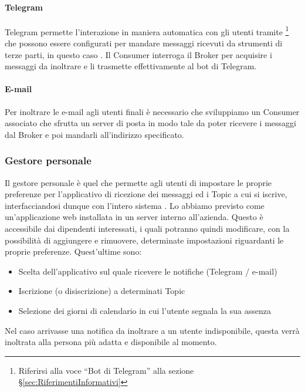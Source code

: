 		\paragraph{Telegram}
		Telegram permette l'interazione in maniera automatica con gli utenti tramite \footnote{Riferirsi alla voce ``Bot di Telegram'' alla sezione \S\ref{sec:RiferimentiInformativi}} che possono essere configurati per mandare messaggi ricevuti da strumenti di terze parti, in questo caso \progetto.
		Il Consumer interroga il Broker per acquisire i messaggi da inoltrare e li trasmette effettivamente al bot di Telegram.
		
		\paragraph{E-mail}
		Per inoltrare le e-mail agli utenti finali è necessario che sviluppiamo un Consumer associato che sfrutta un server di posta in modo tale da poter ricevere i messaggi dal Broker e poi mandarli all'indirizzo specificato.
		
	
	\subsubsection{Gestore personale}
	Il gestore personale è quel  che permette agli utenti di impostare le proprie preferenze per l'applicativo di ricezione dei messaggi ed i Topic a cui si iscrive, interfacciandosi dunque con l'intero sistema \progetto.
	Lo abbiamo previsto come un'applicazione web installata in un server interno all'azienda.
	Questo è accessibile dai dipendenti interessati, i quali potranno quindi modificare, con la possibilità di aggiungere e rimuovere, determinate impostazioni riguardanti le proprie preferenze.
	\newpage
	Quest'ultime sono:
	\begin{itemize}
		\item Scelta dell'applicativo sul quale ricevere le notifiche (Telegram / e-mail)
		\item Iscrizione (o disiscrizione) a determinati Topic
		\item Selezione dei giorni di calendario in cui l'utente segnala la sua assenza
	\end{itemize}
	Nel caso arrivasse una notifica da inoltrare a un utente indisponibile, questa verrà inoltrata alla persona più adatta e disponibile al momento.
	
